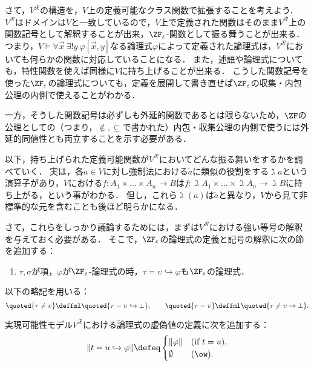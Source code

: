 \documentclass[realisability.tex]{subfiles}
\begin{document}
さて，$V^{\mathcal{R}}$の構造を，$V$上の定義可能なクラス関数で拡張することを考えよう．
$V^{\mathcal{R}}$はドメインは$V$と一致しているので，$V$上で定義された関数はそのまま$V^{\mathcal{R}}$上の関数記号として解釈することが出来，$\ZFe$-関数として振る舞うことが出来る．
つまり，$V \models \forall \vec{x} \: \exists! y \: \varphi[\vec{x}, y]$なる論理式$\varphi$によって定義された論理式は，$V^{\mathcal{R}}$においても何らかの関数に対応していることになる．
また，述語や論理式についても，特性関数を使えば同様に$V$に持ち上げることが出来る．
こうした関数記号を使った$\ZF_\varepsilon$の論理式についても，定義を展開して書き直せば$\ZF_\varepsilon$の収集・内包公理の内側で使えることがわかる．

一方，そうした関数記号は必ずしも外延的関数であるとは限らないため，$\ZF$の公理としての（つまり，${\notin}, {\subseteq}$で書かれた）内包・収集公理の内側で使うには外延的同値性とも両立することを示す必要がある．

以下，持ち上げられた定義可能関数が$V^{\mathcal{R}}$においてどんな振る舞いをするかを調べていく．
実は，各$a \in V$に対し強制法における$\check{a}$に類似の役割をする$\gimel a$という演算子があり，$V$における$f: A_1 \times \dots \times A_n \to B$は$f: \gimel A_1 \times \dots \times \gimel A_n \to \gimel B$に持ち上がる，という事がわかる．
但し，これら$\gimel(a)$は$\check{a}$と異なり，$V$から見て非標準的な元を含むことも後ほど明らかになる．

さて，これらをしっかり議論するためには，まずは$V^{\mathcal{R}}$における強い等号の解釈を与えておく必要がある．
そこで，$\ZF_{\varepsilon}$の論理式の定義と記号の解釈に次の節を追加する：

\begin{definition}
 \begin{enumerate}[resume*=fml-def]
  \item $\tau, \sigma$が項，$\varphi$が$\ZF_{\varepsilon}$-論理式の時，$\tau = \upsilon \hookrightarrow \varphi$も$\ZF_{\varepsilon}$の論理式．
 \end{enumerate}
 以下の略記を用いる：
 \[
  \quoted{\tau \neq \upsilon} \deffml \quoted{\tau = \upsilon \hookrightarrow \bot},\qquad
  \quoted{\tau = \upsilon} \deffml \quoted{\tau \neq \upsilon \to \bot}.
 \]

 実現可能性モデル$V^{\mathcal{R}}$における論理式の虚偽値の定義に次を追加する：
 \[
  \| t = u \hookrightarrow \varphi \|
   \defeq
   \begin{cases}
    \| \varphi \| & (\text{if } t = u),\\
    \emptyset & (\ow).
   \end{cases}
 \]
\end{definition}
\end{document}
